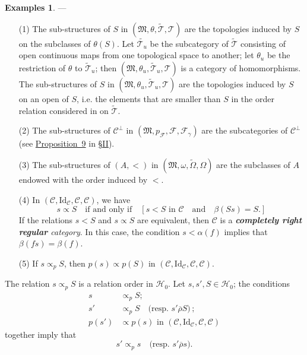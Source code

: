 \documentclass[a4paper,fleqn]{article}
\theoremstyle{plain}
\newenvironment{theorem}[1]
  {\renewcommand\theinnertheorem{#1}\innertheorem}
  {\endinnertheorem}
\theoremstyle{definition}
\newtheorem*{examples}{Examples}
\newcommand{\oldpage}[1]{{\marginpar{\footnotesize$\bigg\vert$\,\,\,\,\textit{p.~#1}}}}
\newcommand{\unsure}[1]{{\color{purple}\textbf{#1}}}
\newcommand{\textand}{\quad\text{and}\quad}
\newcommand{\CC}{\mathcal{C}}
\newcommand{\HH}{\mathcal{H}}
\newcommand{\MM}{\mathfrak{M}}
\newcommand{\FF}{\mathcal{F}}
\newcommand{\TT}{\mathcal{T}}
\newcommand{\tTT}{\widetilde{\TT}}
\newcommand{\relrhobar}{\mathrel{\overline{\rho}}}
\newcommand{\subs}{\mathrel{\propto}}
\newcommand{\Id}{\mathrm{Id}}
\begin{document}
\begin{examples}
  ---
  \begin{enumerate}
    \item[\normalfont(1)]
      The sub-structures of $S$ in $(\MM,\theta,\tTT,\TT)$ are the topologies induced by $S$ on the subclasses of $\theta(S)$.
      Let $\widetilde{\TT_u}$ be the subcategory of $\tTT$ consisting of open continuous maps from one topological space to another;
      let $\theta_u$ be the restriction of $\theta$ to $\tTT_u$;
      then $(\MM,\theta_u,\tTT_u,\TT)$ is a category of homomorphisms.
      The sub-structures of $S$ in $(\MM,\theta_u,\tTT_u,\TT)$ are the topologies induced by $S$ on an open of $S$, i.e. the elements that are smaller than $S$ in the order relation considered in \cite{3c} on $\tTT$.
    \item[\normalfont(2)]
      The sub-structures of $\CC^\perp$ in $(\MM,p_\FF,\FF,\FF_\gamma)$ are the subcategories of $\CC^\perp$ (see \hyperref[proposition:i-9]{Proposition~9} in \hyperref[section:ii]{§II}).
    \item[\normalfont(3)]
      The sub-structures of $(A,<)$ in $(\MM,\omega,\widetilde{\Omega},\Omega)$ are the subclasses of $A$ endowed with the order induced by $<$.
    \item[\normalfont(4)]
      In $(\CC,\Id_\CC,\CC,\CC)$, we have
      \[
        s\subs S
        \quad\text{if and only if}\quad
        [
          \text{$s<S$ in $\CC$}
          \textand
          \beta(Ss)=S.
        ]
      \]
      If the relations $s<S$ and $s\subs S$ are equivalent, then $\CC$ is a \emph{\unsure{completely right regular} category}.
      In this case, the condition $s<\alpha(f)$ implies that $\beta(fs)=\beta(f)$.
    \item[\normalfont(5)]
      If $s\subs_p S$, then $p(s)\subs p(S)$ in $(\CC,\Id_\CC,\CC,\CC)$.
  \end{enumerate}
\end{examples}

\begin{theorem}{1}
\label{theorem:i-1}
  \oldpage{362}
  The relation $s\subs_p S$ is a relation order in $\HH_0$.
  Let $s,s',S\in\HH_0$;
  the conditions
  \[
    \begin{aligned}
      s&\subs_p S;
    \\s'&\subs_p S
      \quad\text{(resp. $s'\relrhobar S$)}\,;
    \\p(s')&\subs p(s)\text{ in }(\CC,\Id_\CC,\CC,\CC)
    \end{aligned}
  \]
  together imply that
  \[
    s'\subs_p s
    \quad\text{(resp. $s'\relrhobar s$)}.
  \]
\end{theorem}
\end{document}
